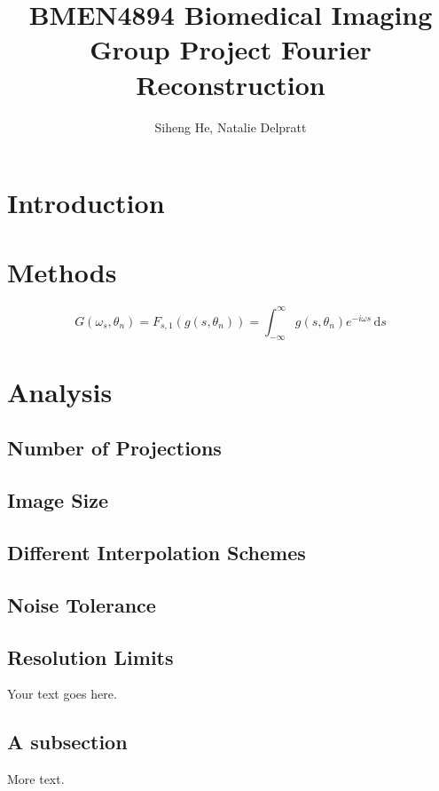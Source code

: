 \documentclass[12pt]{article} %
\title{BMEN4894 Biomedical Imaging \\
Group Project Fourier Reconstruction}
\author{Siheng He, Natalie Delpratt}
\newcommand{\ud}{\,\mathrm{d}}
\begin{document}
\maketitle
\newpage
\section{Introduction}
\section{Methods}
\begin{equation}
G(\omega_s,\theta_n)=F_{s,1}\left(g\left(s,\theta_n\right)\right)=\int_{-\infty}^{\infty} g(s,\theta_n)e^{-i\omega s}\ud s
\end{equation}
\section{Analysis}
\subsection{Number of Projections}
\subsection{Image Size}
\subsection{Different Interpolation Schemes}
\subsection{Noise Tolerance}
\subsection{Resolution Limits}

Your text goes here.

\subsection{A subsection}

More text.
\end{document}

